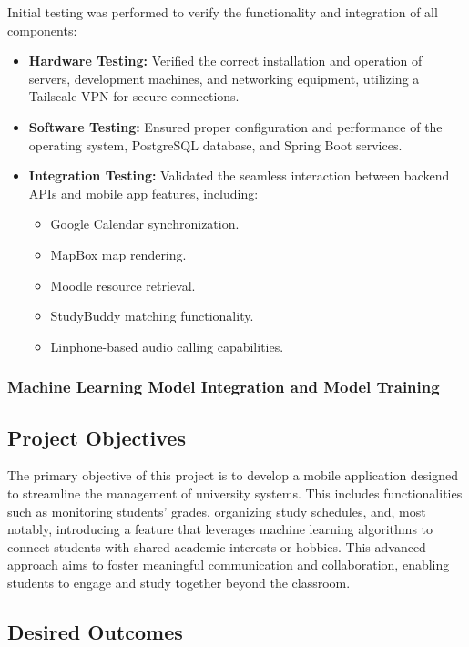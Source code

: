 \documentclass{article}
\makeatletter
\newcommand\subsubsubsection{\@startsection{paragraph}{4}{\z@}{-2.5ex\@plus -1ex \@minus -.25ex}{1.25ex \@plus .25ex}{\normalfont\normalsize\bfseries}}
\makeatother
\begin{document}
\subsubsubsection{Initial Testing}
Initial testing was performed to verify the functionality and integration of all components:

\begin{itemize}
    \item \textbf{Hardware Testing:} Verified the correct installation and operation of servers, development machines, and networking equipment, utilizing a Tailscale VPN for secure connections.
    \item \textbf{Software Testing:} Ensured proper configuration and performance of the operating system, PostgreSQL database, and Spring Boot services.
    \item \textbf{Integration Testing:} Validated the seamless interaction between backend APIs and mobile app features, including:
    \begin{itemize}
        \item Google Calendar synchronization.
        \item MapBox map rendering.
        \item Moodle resource retrieval.
        \item StudyBuddy matching functionality.
        \item Linphone-based audio calling capabilities.
    \end{itemize}
\end{itemize}
\subsubsection{Machine Learning Model Integration and Model Training}

\subsection{Project Objectives}
The primary objective of this project is to develop a mobile application designed to streamline the management of university systems. 
This includes functionalities such as monitoring students' grades, organizing study schedules, and, most notably, introducing 
a feature that leverages machine learning algorithms to connect students with shared academic interests or hobbies. 
This advanced approach aims to foster meaningful communication and collaboration, enabling students to engage and study together beyond the classroom.

\subsection{Desired Outcomes}
\end{document}
